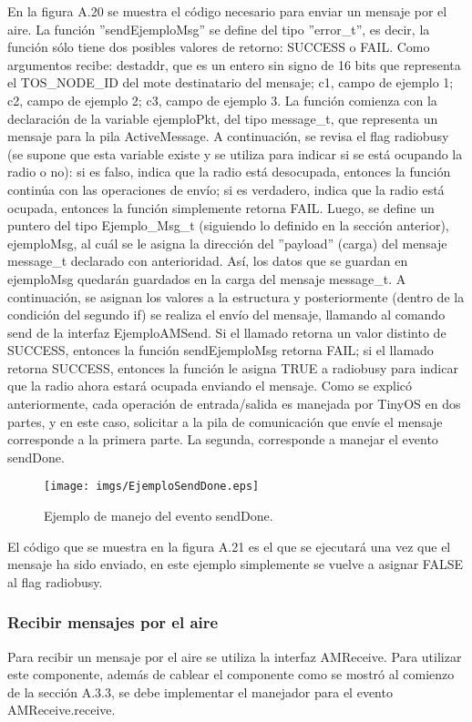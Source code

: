 En la figura A.20 se muestra el código necesario para enviar un mensaje por el aire. La función ''sendEjemploMsg'' se define del tipo ''error\_t'', es decir, la función sólo tiene dos posibles valores de retorno: SUCCESS o FAIL. Como argumentos recibe: destaddr, que es un entero sin signo de 16 bits que representa el TOS\_NODE\_ID del mote destinatario del mensaje; c1, campo de ejemplo 1; c2, campo de ejemplo 2; c3, campo de ejemplo 3. La función comienza con la declaración de la variable ejemploPkt, del tipo message\_t, que representa un mensaje para la pila ActiveMessage. A continuación, se revisa el flag radiobusy (se supone que esta variable existe y se utiliza para indicar si se está ocupando la radio o no): si es falso, indica que la radio está desocupada, entonces la función continúa con las operaciones de envío; si es verdadero, indica que la radio está ocupada,  entonces la función simplemente retorna FAIL. Luego, se define un puntero del tipo Ejemplo\_Msg\_t (siguiendo lo definido en la sección anterior), ejemploMsg, al cuál se le asigna la dirección del ''payload'' (carga) del mensaje message\_t declarado con anterioridad. Así, los datos que se guardan en ejemploMsg quedarán guardados en la carga del mensaje message\_t. A continuación, se asignan los valores a la estructura y posteriormente (dentro de la condición del segundo if) se realiza el envío del mensaje, llamando al comando send de la interfaz EjemploAMSend. Si el llamado retorna un valor distinto de SUCCESS, entonces la función sendEjemploMsg retorna FAIL; si el llamado retorna SUCCESS, entonces la función le asigna TRUE a radiobusy para indicar que la radio ahora estará ocupada enviando el mensaje. Como se explicó anteriormente, cada operación de entrada/salida es manejada por TinyOS en dos partes, y en este caso, solicitar a la pila de comunicación que envíe el mensaje corresponde a la primera parte. La segunda, corresponde a manejar el evento sendDone.

\begin{center}
\begin{figure}[H]
\centering
\texttt{[image: imgs/EjemploSendDone.eps]} 
\caption{Ejemplo de manejo del evento sendDone.}
\end{figure}
\end{center}

El código que se muestra en la figura A.21 es el que se ejecutará una vez que el mensaje ha sido enviado, en este ejemplo simplemente se vuelve a asignar FALSE al flag radiobusy.

\subsubsection{Recibir mensajes por el aire}
Para recibir un mensaje por el aire se utiliza la interfaz AMReceive. Para utilizar este componente, además de cablear el componente como se mostró al comienzo de la sección A.3.3, se debe implementar el manejador para el evento AMReceive.receive.

